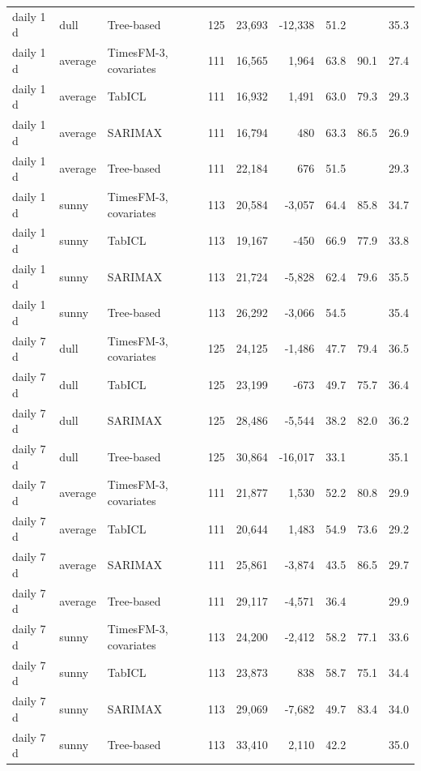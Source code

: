 \begin{tabular}{lllrrrrrr}
daily 1 d & dull & Tree-based & 125 & 23,693 & -12,338 & 51.2 &  & 35.3 \\
daily 1 d & average & TimesFM-3, covariates & 111 & 16,565 & 1,964 & 63.8 & 90.1 & 27.4 \\
daily 1 d & average & TabICL & 111 & 16,932 & 1,491 & 63.0 & 79.3 & 29.3 \\
daily 1 d & average & SARIMAX & 111 & 16,794 & 480 & 63.3 & 86.5 & 26.9 \\
daily 1 d & average & Tree-based & 111 & 22,184 & 676 & 51.5 &  & 29.3 \\
daily 1 d & sunny & TimesFM-3, covariates & 113 & 20,584 & -3,057 & 64.4 & 85.8 & 34.7 \\
daily 1 d & sunny & TabICL & 113 & 19,167 & -450 & 66.9 & 77.9 & 33.8 \\
daily 1 d & sunny & SARIMAX & 113 & 21,724 & -5,828 & 62.4 & 79.6 & 35.5 \\
daily 1 d & sunny & Tree-based & 113 & 26,292 & -3,066 & 54.5 &  & 35.4 \\
daily 7 d & dull & TimesFM-3, covariates & 125 & 24,125 & -1,486 & 47.7 & 79.4 & 36.5 \\
daily 7 d & dull & TabICL & 125 & 23,199 & -673 & 49.7 & 75.7 & 36.4 \\
daily 7 d & dull & SARIMAX & 125 & 28,486 & -5,544 & 38.2 & 82.0 & 36.2 \\
daily 7 d & dull & Tree-based & 125 & 30,864 & -16,017 & 33.1 &  & 35.1 \\
daily 7 d & average & TimesFM-3, covariates & 111 & 21,877 & 1,530 & 52.2 & 80.8 & 29.9 \\
daily 7 d & average & TabICL & 111 & 20,644 & 1,483 & 54.9 & 73.6 & 29.2 \\
daily 7 d & average & SARIMAX & 111 & 25,861 & -3,874 & 43.5 & 86.5 & 29.7 \\
daily 7 d & average & Tree-based & 111 & 29,117 & -4,571 & 36.4 &  & 29.9 \\
daily 7 d & sunny & TimesFM-3, covariates & 113 & 24,200 & -2,412 & 58.2 & 77.1 & 33.6 \\
daily 7 d & sunny & TabICL & 113 & 23,873 & 838 & 58.7 & 75.1 & 34.4 \\
daily 7 d & sunny & SARIMAX & 113 & 29,069 & -7,682 & 49.7 & 83.4 & 34.0 \\
daily 7 d & sunny & Tree-based & 113 & 33,410 & 2,110 & 42.2 &  & 35.0 \\
\bottomrule
\end{tabular}
